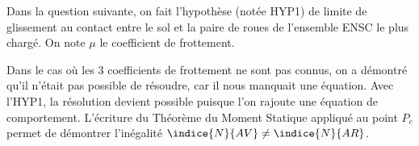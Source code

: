 \ifprof
\else
Dans la question suivante, on fait l'hypothèse (notée HYP1) de limite de glissement au contact
entre le sol et la paire de roues de l'ensemble ENSC le plus chargé. On note $\mu$ le coefficient
de frottement.
\fi

\ifprof
\begin{corrige}
Dans le cas où les 3 coefficients de frottement ne sont pas connus, on a démontré qu’il n’était pas possible de résoudre, car il nous manquait une équation.
Avec l’HYP1, la résolution devient possible puisque l’on rajoute une équation de comportement.
L’écriture du Théorème du Moment Statique appliqué au point $P_c$  permet de démontrer l’inégalité $\indice{N}{AV}\neq\indice{N}{AR}$.

\end{corrige}
\else
\fi


